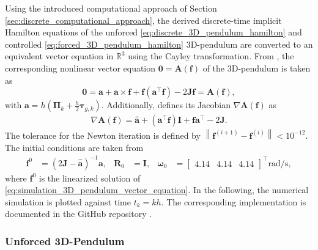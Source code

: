 Using the introduced computational approach of Section \ref{sec:discrete_computational_approach}, the derived discrete-time implicit Hamilton equations
of the unforced \eqref{eq:discrete_3D_pendulum_hamilton} and controlled \eqref{eq:forced_3D_pendulum_hamilton} 3D-pendulum are converted to an equivalent vector equation in $\mathbb{R}^3$ using the Cayley transformation. From \cite{ColomboJimenez2012SO3_Cayley}, the corresponding nonlinear vector equation $\bm{0} = \bm{A}(\bm{f})$ of the 3D-pendulum is taken as
\begin{equation}\label{eq:simulation_3D_pendulum_vector_equation}
    \bm{0} = \bm{a}+\bm{a} \times \bm{f} + \bm{f}(\bm{a}^\top \bm{f})-2 \bm{J} \bm{f} = \bm{A}(\bm{f}),
\end{equation}
with $\bm{a}= h (\bm{\Pi}_k + \frac{h}{2} \bm{\tau}_{g,k})$. Additionally, \cite{ColomboJimenez2012SO3_Cayley} defines its Jacobian $\nabla \bm{A}\!\left(\bm{f}\right)$ as
\begin{align}\label{eq:Caley_Jacobian}
\nabla \bm{A}(\bm{f})
=
\hat{\bm{a}}
+
(\bm{a}^{\top}\bm{f})\bm{I}
+
\bm{f}\bm{a}^{\top}
-
2\bm{J}.
\end{align}
The tolerance for the Newton iteration is defined by $\left\lVert \bm{f}^{(i+1)} - \bm{f}^{(i)} \right\rVert < 10^{-12}$. The initial conditions are taken from \cite{Lee2008} 
\begin{align}
\bm{f}^0 &= (2 \bm{J} - \hat{\bm{a}})^{-1}\bm{a},&
    \bm{R}_0 &= \bm{I}, &
    \bm{\omega}_0 &=
    \begin{bmatrix}
        4.14 & 4.14 & 4.14
    \end{bmatrix}^{\top}\si{\radian\per\second},
\end{align} where $\bm{f}^0$ is the linearized solution of
\eqref{eq:simulation_3D_pendulum_vector_equation}.
In the following, the numerical simulation is plotted against time $t_k = kh$. 
The corresponding implementation is documented in the GitHub repository \cite{Elshani2026CTO_GitHub}.

\subsubsection{Unforced 3D-Pendulum}

